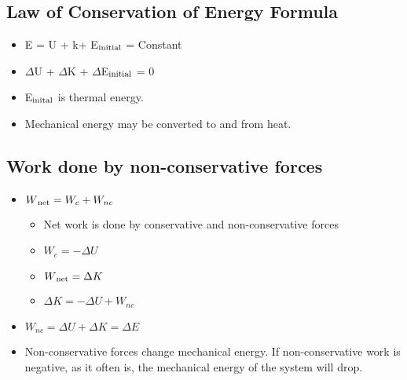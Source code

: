 \subsection{Law of Conservation of Energy Formula}
\begin{itemize}
	\item E = U + k+ E$\textsubscript{initial}$ = Constant
	\item $\Delta$U + $\Delta$K + $\Delta$E$\textsubscript{initial}$ = 0
	\item E$\textsubscript{inital}$ is thermal energy.
	\item Mechanical energy may be converted to and from heat.
\end{itemize}

\subsection{Work done by non-conservative forces}
\begin{itemize}
	\item $W\textsubscript{net}=W_c+W_{nc}$
	\begin{itemize}
		\item Net work is done by conservative and non-conservative forces
		\item $W_c = -\Delta U$
		\item $W\textsubscript{net}=\Delta K$
		\item $\Delta K = -\Delta U + W_{nc}$
	\end{itemize}
	\item $W_{nc}=\Delta U + \Delta K = \Delta E$
	\item Non-conservative forces change mechanical energy. If non-conservative work is negative, as it often is, the mechanical energy of the system will drop.
\end{itemize}